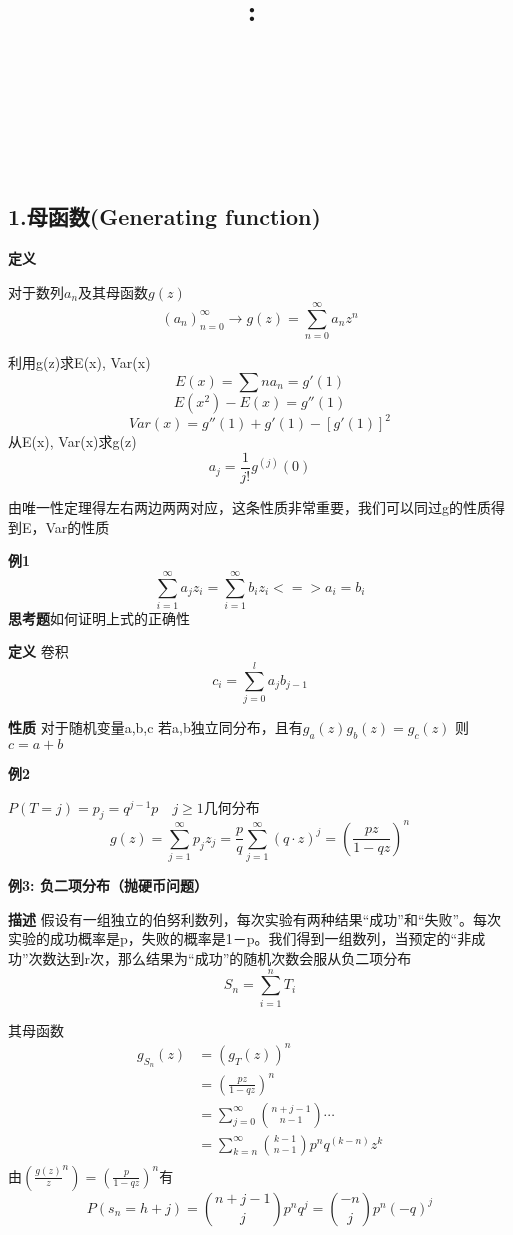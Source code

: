 \documentclass{article}
\title{
    \vspace{2in}
    \textmd{\textbf{\hmwkClass:\ \hmwkTitle}}\\
    \normalsize\vspace{0.1in}\small{\hmwkDueDate\ }\\
    \vspace{0.1in}\large{\textit{\hmwkClassInstructor\ \hmwkClassTime}}
    \vspace{3in}
}
\author{\textbf{\hmwkAuthorName} \\
 }
\date{}
\begin{document}
\begin{CJK*}{UTF8}{gbsn}
\maketitle

\pagebreak
\section{1.母函数(Generating function) }
\textbf{定义}

对于数列$a_n$及其母函数$g(z)$
$$(a_n)^{\infty}_{n=0} \to g(z) = \sum^{\infty}_{n=0}a_n z^n$$

利用g(z)求E(x), Var(x)
$$E(x) = \sum n a_n = g'(1)$$
$$E(x^2) - E(x) = g''(1)$$
$$Var(x) = g''(1)+g'(1)-[g'(1)]^2$$
从E(x), Var(x)求g(z)
$$a_j = \frac{1}{j!}g^{(j)}(0)$$

由唯一性定理得左右两边两两对应，这条性质非常重要，我们可以同过g的性质得到E，Var的性质

\textbf{例1}
	$$\sum^{\infty}_{i=1}a_j z_i = \sum^{\infty}_{i=1}b_i z_i <=> a_i = b_i$$
\textbf{思考题}如何证明上式的正确性

\textbf{定义}
卷积
$$c_i = \sum^l_{j=0} a_j b_{j-1}$$

\textbf{性质}
对于随机变量a,b,c
若a,b独立同分布，且有$g_a(z)g_b(z) = g_c(z)$
则$c=a+b$

\textbf{例2}

$P(T=j) = p_j = q^{j-1}p \quad j\geq 1$几何分布
$$
g(z) = \sum^{\infty}_{j=1}p_j z_j = \frac{p}{q}\sum^{\infty}_{j=1}(q\cdot z)^j
 = (\frac{p z}{1-q z})^n
$$

\textbf{例3: 负二项分布（抛硬币问题）}

\textbf{描述}
假设有一组独立的伯努利数列，每次实验有两种结果“成功”和“失败”。每次实验的成功概率是p，失败的概率是1－p。我们得到一组数列，当预定的“非成功”次数达到r次，那么结果为“成功”的随机次数会服从负二项分布
\[
S_n = \sum_{i=1}^n T_i
\]

其母函数
\[
\begin{split}
g_{S_n}(z) 
	& = (g_T(z))^n \\
	& = (\frac{pz}{1-qz})^n \\
	& = \sum^{\infty}_{j=0} \binom{n+j-1}{n-1} \cdots \\
	& = \sum^{\infty}_{k=n} \binom{k-1}{n-1} p^n q^(k-n) z^k \\
\end{split}
\]
由$(\frac{g(z)}{z}^n) = (\frac{p}{1-qz})^n$有
\[
P(s_n=h+j) = \binom{n+j-1}{j}p^n q^j= \binom{-n}{j}p^n(-q)^j
\]


\end{CJK*}
\end{document}
